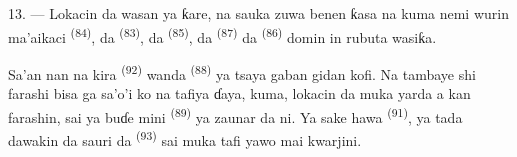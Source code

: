 13. --- Lokacin da wasan ya ƙare, na sauka zuwa benen ƙasa na kuma
nemi wurin ma’aikaci  \textsuperscript{(84)}, da
 \textsuperscript{(83)}, da 
\textsuperscript{(85)}, da  \textsuperscript{(87)} da
 \textsuperscript{(86)} domin in rubuta wasiƙa.

Sa’an nan na kira  \textsuperscript{(92)} wanda
 \textsuperscript{(88)} ya tsaya gaban gidan kofi. Na
tambaye shi farashi bisa ga sa’o’i ko na tafiya ɗaya, kuma, lokacin da
muka yarda a kan farashin, sai ya buɗe mini 
\textsuperscript{(89)} ya zaunar da ni. Ya sake hawa 
\textsuperscript{(91)}, ya tada dawakin da sauri da 
\textsuperscript{(93)} sai muka tafi yawo mai kwarjini.

\VUsaut{6.0mm}
\VUfilet{22mm}
